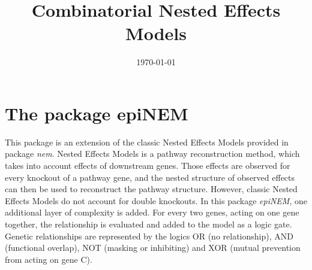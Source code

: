 \documentclass[paper=a4,notitlepage,DIV=12]{scrartcl}\usepackage[]{graphicx}\usepackage[]{color}
\title{Combinatorial Nested Effects Models}
\date{\today}
\begin{document}
\maketitle



\thispagestyle{empty}
\tableofcontents
\listoftodos

\clearpage

\section{The package epiNEM}

This package is an extension of the classic Nested Effects Models provided in package \emph{nem}. Nested Effects Models is a pathway reconstruction method, which takes into account effects of downstream genes. Those effects are observed for every knockout of a pathway gene, and the nested structure of observed effects can then be used to reconstruct the pathway structure.
However, classic Nested Effects Models do not account for double knockouts. In this package \emph{epiNEM}, one additional layer of complexity is added. For every two genes, acting on one gene together, the relationship is evaluated and added to the model as a logic gate. Genetic relationships are represented by the logics OR (no relationship), AND (functional overlap), NOT (masking or inhibiting) and XOR (mutual prevention from acting on gene C).
\end{document}
